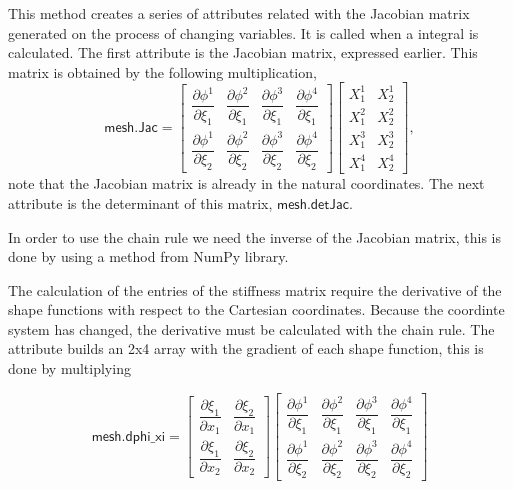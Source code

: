 \documentclass[11pt, a4paper]{article}
\numberwithin{equation}{section}
\begin{document}
This method creates a series of attributes related with the Jacobian matrix generated on the process of changing variables. It is called when a integral is calculated. The first attribute is the Jacobian matrix, expressed earlier. This matrix is obtained by the following multiplication,
\begin{equation*}
\mathsf{mesh.Jac} = 
\begin{bmatrix}
\dfrac{\partial \phi^1}{\partial \xi_1} & \dfrac{\partial \phi^2}{\partial \xi_1} & \dfrac{\partial \phi^3}{\partial \xi_1} & \dfrac{\partial \phi^4}{\partial \xi_1}\\[.4cm]
\dfrac{\partial \phi^1}{\partial \xi_2} & \dfrac{\partial \phi^2}{\partial \xi_2} & \dfrac{\partial \phi^3}{\partial \xi_2} & \dfrac{\partial \phi^4}{\partial \xi_2}
\end{bmatrix}
\begin{bmatrix}
X^1_1 & X^1_2 \\[.2cm]
X^2_1 & X^2_2 \\[.2cm]
X^3_1 & X^3_2 \\[.2cm]
X^4_1 & X^4_2 
\end{bmatrix},
\end{equation*} 
note that the Jacobian matrix is already in the natural coordinates. The next attribute is the determinant of this matrix, $\textsf{mesh.detJac}$. 

In order to use the chain rule we need the inverse of the Jacobian matrix, this is done by using a method from \textsf{NumPy} library.

The calculation of the entries of the stiffness matrix require the derivative of the shape functions with respect to the Cartesian coordinates. Because the coordinte system has changed, the derivative must be calculated with the chain rule. The attribute builds an 2x4 array with the gradient of each shape function, this is done by multiplying

\begin{equation*}
\textsf{mesh.dphi}\_\textsf{xi} = \begin{bmatrix}
\dfrac{\partial \xi_1}{\partial x_1} & \dfrac{\partial \xi_2}{\partial x_1} \\[.4cm]
\dfrac{\partial \xi_1}{\partial x_2} & \dfrac{\partial \xi_2}{\partial x_2}
\end{bmatrix}
\begin{bmatrix}
\dfrac{\partial \phi^1}{\partial \xi_1} & \dfrac{\partial \phi^2}{\partial \xi_1} & \dfrac{\partial \phi^3}{\partial \xi_1} & \dfrac{\partial \phi^4}{\partial \xi_1}\\[.4cm]
\dfrac{\partial \phi^1}{\partial \xi_2} & \dfrac{\partial \phi^2}{\partial \xi_2} & \dfrac{\partial \phi^3}{\partial \xi_2} & \dfrac{\partial \phi^4}{\partial \xi_2}
\end{bmatrix}
\end{equation*}
\end{document}
